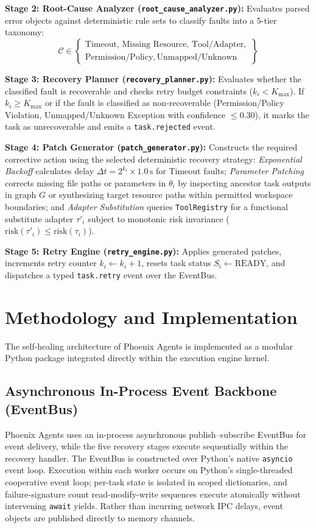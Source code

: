 \documentclass[conference]{IEEEtran}
\begin{document}
\textbf{Stage 2: Root-Cause Analyzer (\texttt{root\_cause\_analyzer.py}):} Evaluates parsed error objects against deterministic rule sets to classify faults into a 5-tier taxonomy:
\begin{equation}
\mathcal{C} \in \left\{
\begin{array}{l}
\text{Timeout}, \, \text{Missing Resource}, \, \text{Tool/Adapter}, \\
\text{Permission/Policy}, \, \text{Unmapped/Unknown}
\end{array}
\right\}
\end{equation}

\textbf{Stage 3: Recovery Planner (\texttt{recovery\_planner.py}):} Evaluates whether the classified fault is recoverable and checks retry budget constraints ($k_i < K_{\text{max}}$). If $k_i \ge K_{\text{max}}$ or if the fault is classified as non-recoverable (Permission/Policy Violation, Unmapped/Unknown Exception with confidence $\le 0.30$), it marks the task as unrecoverable and emits a \texttt{task.rejected} event.

\textbf{Stage 4: Patch Generator (\texttt{patch\_generator.py}):} Constructs the required corrective action using the selected deterministic recovery strategy: \textit{Exponential Backoff} calculates delay $\Delta t = 2^{k_i} \times 1.0\,\text{s}$ for Timeout faults; \textit{Parameter Patching} corrects missing file paths or parameters in $\theta_i$ by inspecting ancestor task outputs in graph $G$ or synthesizing target resource paths within permitted workspace boundaries; and \textit{Adapter Substitution} queries \texttt{ToolRegistry} for a functional substitute adapter $\tau'_i$ subject to monotonic risk invariance ($\text{risk}(\tau'_i) \le \text{risk}(\tau_i)$).

\textbf{Stage 5: Retry Engine (\texttt{retry\_engine.py}):} Applies generated patches, increments retry counter $k_i \leftarrow k_i + 1$, resets task status $S_i \leftarrow \text{READY}$, and dispatches a typed \texttt{task.retry} event over the EventBus.

\section{Methodology and Implementation}
The self-healing architecture of Phoenix Agents is implemented as a modular Python package integrated directly within the execution engine kernel.

\subsection{Asynchronous In-Process Event Backbone (EventBus)}
Phoenix Agents uses an in-process asynchronous publish--subscribe EventBus for event delivery, while the five recovery stages execute sequentially within the recovery handler. The EventBus is constructed over Python's native \texttt{asyncio} event loop. Execution within each worker occurs on Python's single-threaded cooperative event loop; per-task state is isolated in scoped dictionaries, and failure-signature count read-modify-write sequences execute atomically without intervening \texttt{await} yields. Rather than incurring network IPC delays, event objects are published directly to memory channels.
\end{document}
